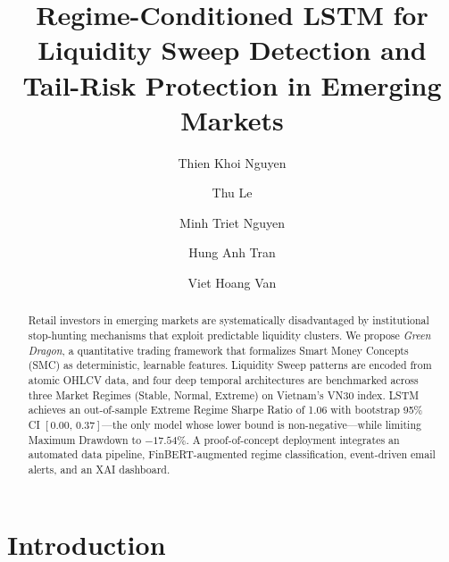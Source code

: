 \documentclass[runningheads]{llncs}
\begin{document}
\title{Regime-Conditioned LSTM for Liquidity Sweep Detection and Tail-Risk Protection in Emerging Markets}


\author{Thien Khoi Nguyen \and
Thu Le \and
Minh Triet Nguyen \and
Hung Anh Tran \and
Viet Hoang Van}



\maketitle

\begin{abstract}
Retail investors in emerging markets are systematically disadvantaged by institutional stop-hunting mechanisms that exploit predictable liquidity clusters. We propose \textit{Green Dragon}, a quantitative trading framework that formalizes Smart Money Concepts (SMC) as deterministic, learnable features. Liquidity Sweep patterns are encoded from atomic OHLCV data, and four deep temporal architectures are benchmarked across three Market Regimes (Stable, Normal, Extreme) on Vietnam's VN30 index. LSTM achieves an out-of-sample Extreme Regime Sharpe Ratio of 1.06 with bootstrap 95\% CI $[0.00,\,0.37]$---the only model whose lower bound is non-negative---while limiting Maximum Drawdown to $-17.54\%$. A proof-of-concept deployment integrates an automated data pipeline, FinBERT-augmented regime classification, event-driven email alerts, and an XAI dashboard.

\end{abstract}

\section{Introduction}
\end{document}
